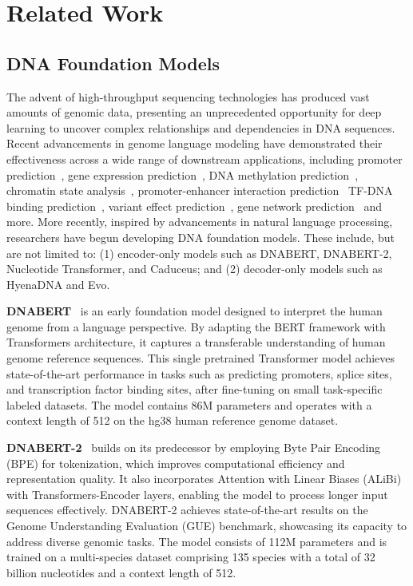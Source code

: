 \section{Related Work}
\subsection{DNA Foundation Models}

The advent of high-throughput sequencing technologies has produced vast amounts of genomic data, presenting an unprecedented opportunity for deep learning to uncover complex relationships and dependencies in DNA sequences. Recent advancements in genome language modeling have demonstrated their effectiveness across a wide range of downstream applications, including promoter prediction~\citep{le2022bert,zhang2022ipro}, gene expression  prediction~\citep{avsec2021effective}, DNA methylation prediction~\citep{jin2022idna}, chromatin state analysis~\citep{lee2022learning}, promoter-enhancer interaction prediction~\citep{chen2022capturing,ni2022epi}
TF-DNA binding prediction~\citep{wang2022towards}, variant effect prediction~\citep{rozowsky2023tex},
gene network prediction~\citep{theodoris2023transfer} and more.
More recently, inspired by advancements in natural language processing, researchers have begun developing DNA foundation models. These include, but are not limited to: (1) encoder-only models such as DNABERT, DNABERT-2, Nucleotide Transformer,  and Caduceus; and (2) decoder-only models such as HyenaDNA and Evo.

\textbf{DNABERT}~\citep{ji2021dnabert} is an early foundation model designed to interpret the human genome from a language perspective. By adapting the BERT framework with Transformers architecture, it captures a transferable understanding of human genome reference sequences. This single pretrained Transformer model achieves state-of-the-art performance in tasks such as predicting promoters, splice sites, and transcription factor binding sites, after fine-tuning on small task-specific labeled datasets. The model contains 86M parameters and operates with a context length of 512 on the hg38 human reference genome dataset.

\textbf{DNABERT-2}~\citep{zhou2023dnabert2} builds on its predecessor by employing Byte Pair Encoding (BPE) for tokenization, which improves computational efficiency and representation quality. It also incorporates Attention with Linear Biases (ALiBi) with Transformers-Encoder layers, enabling the model to process longer input sequences effectively. DNABERT-2 achieves state-of-the-art results on the Genome Understanding Evaluation (GUE) benchmark, showcasing its capacity to address diverse genomic tasks. The model consists of 112M parameters and is trained on a multi-species dataset comprising 135 species with a total of 32 billion nucleotides and a context length of 512.

